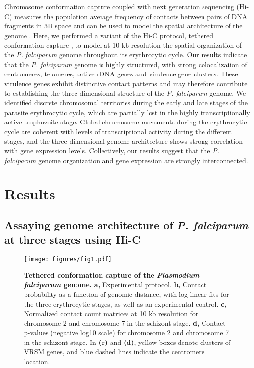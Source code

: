 Chromosome conformation capture coupled with next generation sequencing (Hi-C)
measures the population average frequency of contacts between pairs of DNA
fragments in 3D space and can be used to model the spatial architecture of the
genome \citep{lieberman-aiden:comprehensive, duan:three, kalhor:genome}. Here,
we performed a variant of the Hi-C protocol, tethered conformation capture
\citep{kalhor:genome}, to model at 10 kb resolution the spatial organization
of the {\em P. falciparum} genome throughout its erythrocytic cycle. Our
results indicate that the {\em P. falciparum} genome is highly structured,
with strong colocalization of centromeres, telomeres, active rDNA genes and
virulence gene clusters. These virulence genes exhibit distinctive contact
patterns and may therefore contribute to establishing the three-dimensional
structure of the {\em P. falciparum} genome. We identified discrete
chromosomal territories during the early and late stages of the parasite
erythrocytic cycle, which are partially lost in the highly transcriptionally
active trophozoite stage. Global chromosome movements during the erythrocytic
cycle are coherent with levels of transcriptional activity during the
different stages, and the three-dimensional genome architecture shows strong
correlation with gene expression levels. Collectively, our results suggest
that the {\em P. falciparum} genome organization and gene expression are
strongly interconnected.

\section{Results}

\subsection{Assaying genome architecture of {\em P. falciparum} at three stages using Hi-C}


\begin{figure}[h]
\centering
\texttt{[image: figures/fig1.pdf]}
\caption{{\bf Tethered conformation capture of the {\em Plasmodium falciparum}
genome.}
\textbf{a,} Experimental protocol. \textbf{b,} Contact probability as a
function of genomic distance, with log-linear fits for the three erythrocytic
stages, as well as an experimental control. \textbf{c,} Normalized contact
count matrices at 10 kb resolution for chromosome 2 and chromosome 7 in the
schizont stage. \textbf{d,} Contact p-values (negative log10 scale) for
chromosome 2 and chromosome 7 in the schizont stage. In \textbf{(c)} and
\textbf{(d)}, yellow boxes denote clusters of VRSM genes, and blue dashed
lines indicate the centromere location.}
\label{fig:fig1}
\end{figure}



